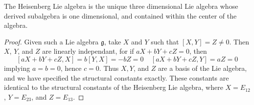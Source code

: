 \begin{theorem}
    The Heisenberg Lie algebra is the unique three dimensional Lie algebra whose derived subalgebra is one dimensional, and contained within the center of the algebra.
\end{theorem}
\begin{proof}
    Given such a Lie algebra $\mathfrak{g}$, take $X$ and $Y$ such that $[X,Y] = Z \neq 0$. Then $X$, $Y$, and $Z$ are linearly independant, for if $aX + bY + cZ = 0$, then
    \[ [aX + bY + cZ, X] = b[Y,X] = -bZ = 0\ \ \ \ \ [aX + bY + cZ, Y] = aZ = 0 \]
    implying $a = b = 0$, hence $c = 0$. Thus $X,Y$, and $Z$ are a basis of the Lie algebra, and we have specified the structural constants exactly. These constants are identical to the structural constants of the Heisenberg Lie algebra, where $X = E_{12}$, $Y = E_{23}$, and $Z = E_{13}$.
\end{proof}

